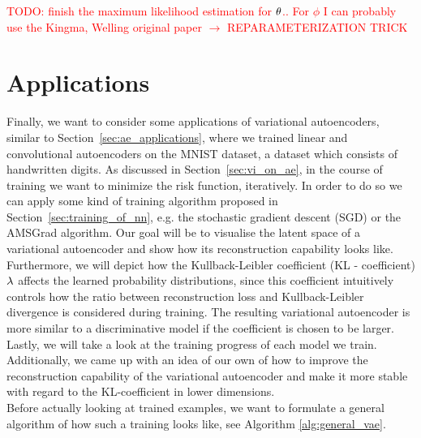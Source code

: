 \textcolor{red}{TODO: finish the maximum likelihood estimation for $\theta$.. For $\phi$ I can probably use the Kingma, Welling original paper $\to$ REPARAMETERIZATION TRICK}


\section{Applications}\label{sec:vae_applications}

Finally, we want to consider some applications of variational autoencoders, similar to Section~\ref{sec:ae_applications}, where we trained linear and convolutional autoencoders on the MNIST dataset, a dataset which consists of handwritten digits. As discussed in Section~\ref{sec:vi_on_ae}, in the course of training we want to minimize the risk function, iteratively. In order to do so we can apply some kind of training algorithm proposed in Section~\ref{sec:training_of_nn}, e.g. the stochastic gradient descent (SGD) or the AMSGrad algorithm. Our goal will be to visualise the latent space of a variational autoencoder and show how its reconstruction capability looks like. Furthermore, we will depict how the Kullback-Leibler coefficient (KL - coefficient) $\lambda$ affects the learned probability distributions, since this coefficient intuitively controls how the ratio between reconstruction loss and Kullback-Leibler divergence is considered during training. The resulting variational autoencoder is \glqq more similar\grqq{} to a discriminative model if the coefficient is chosen to be larger. Lastly, we will take a look at the training progress of each model we train. Additionally, we came up with an idea of our own of how to improve the reconstruction capability of the variational autoencoder and make it more stable with regard to the KL-coefficient  in lower dimensions.\\
Before actually looking at trained examples, we want to formulate a general algorithm of how such a training looks like, see Algorithm \ref{alg:general_vae}.

